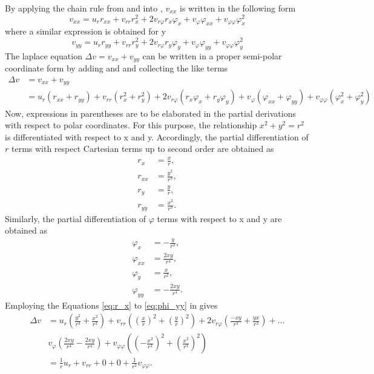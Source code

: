 %
By applying the chain rule from  and  into  , $v_{xx}$ is written in the following form
%
\begin{equation}
	v_{xx} = u_r r_{xx} + v_{rr} r_{x}^2 + 2 v_{r\varphi} r_x \varphi_x + v_\varphi \varphi_{xx} + v_{\varphi \varphi} \varphi_x^2
	\label{eq:uXX_chain}
\end{equation}
%
where a similar expression is obtained for y
\begin{equation}
	v_{yy} = u_r r_{yy} + v_{rr} r_{y}^2 + 2 v_{r\varphi} r_y \varphi_y + v_\varphi \varphi_{yy} + v_{\varphi \varphi} \varphi_y^2
	\label{eq:uYY_chain}
\end{equation}
%
The laplace equation $\Delta v = v_{xx} + v_{yy}$ can be written in a proper semi-polar coordinate form by adding  and  and collecting the like terms
\begin{align}
	\nonumber
	\Delta v &= v_{xx} + v_{yy}\\
	\label{eq:laplaceExpanded}
			 &= u_r(r_{xx} + r_{yy}) + v_{rr} (r_x^2 + r_y^2) + 2 v_{r\varphi} (r_x \varphi_{x} + r_y \varphi_y) + v_\varphi (\varphi_{xx} + \varphi_{yy}) + v_{\varphi\varphi} (\varphi_x^2 + \varphi_y^2)
\end{align}
%
Now, expressions in parentheses are to be elaborated in the partial derivations with respect to polar coordinates.
For this purpose, the relationship $x^2 + y^2 = r^2$ is differentiated with respect to x and y.
Accordingly, the partial differentiation of $r$ terms with respect Cartesian terms up to second order are obtained as
\begin{align}
	\label{eq:r_x}	
	r_x    &= \frac{x}{r},\\
	r_{xx} &= \frac{y^2}{r^3},\\
	r_{y}  &= \frac{y}{r},\\
	r_{yy} &= \frac{x^2}{r^3}\text{.}
\end{align}
%
Similarly, the partial differentiation of $\varphi$ terms with respect to x and y are obtained as
\begin{align}
	\varphi_x    &= -\frac{y}{r^2},\\
	\varphi_{xx} &= \frac{2xy}{r^4},\\
	\varphi_{y}  &= \frac{x}{r^2},\\
	\label{eq:phi_yy}
	\varphi_{yy} &= -\frac{2xy}{r^4}\text{.}
\end{align}
%
Employing the Equations \ref{eq:r_x} to \ref{eq:phi_yy} in  gives
\begin{align*}
	\Delta v &= u_r\left(\frac{y^2}{r^3} + \frac{x^2}{r^3}\right) + v_{rr} \left(\left(\frac{x}{r} \right)^2+ \left(\frac{y}{r} \right)^2\right) + 2 v_{r\varphi} \left(\frac{-xy}{r^3}+\frac{yx}{r^3}\right) + \hdots\\
			 &v_\varphi \left(\frac{2xy}{r^4} - \frac{2xy}{r^4}\right) + v_{\varphi\varphi} \left(\left(-\frac{x^2}{r^3}\right) ^2 + \left(\frac{x^2}{r^3}\right)^2 \right)\\
			 &= \frac{1}{r} u_r + v_{rr} + 0 + 0 + \frac{1}{r^2} v_{\varphi\varphi}.
\end{align*}
